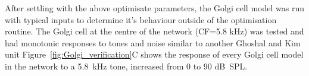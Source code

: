 


After settling with the above optimisate parameters, the Golgi cell model was
run with typical inputs to determine it's behaviour outside of the optimisation
routine.  The Golgi cell at the centre of the network (CF=5.8 kHz) was tested
and had monotonic responses to tones and noise similar to another Ghoshal and
Kim unit Figure~\ref{fig:Golgi_verification}C shows the response of every Golgi cell model in
the network to a 5.8~kHz tone, increased from 0 to 90 dB~{SPL}.

